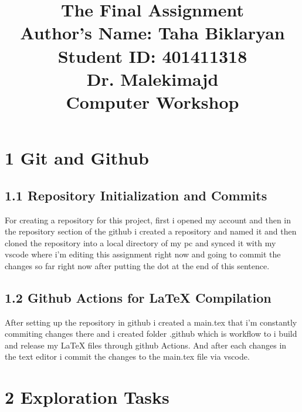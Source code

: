 \documentclass{article}
\title{\Huge The Final Assignment \\[1cm]
\Large Author's Name: Taha Biklaryan \\[0.5cm]
\large Student ID: 401411318 \\[1cm]  
\large Dr. Malekimajd \\[1cm]
\large Computer Workshop}
\date{} %
\begin{document}
\maketitle
\newpage

\tableofcontents %
\newpage

\section*{\Huge 1 Git and Github}
\subsection*{\Large 1.1 Repository Initialization and Commits}
For creating a repository for this project, first i opened my account and then in the repository section of the github i created a repository and named it  and then 
cloned the repository into a local directory of my pc and synced it with my vscode where i'm editing this assignment right now and going to commit the changes so far right now after putting the dot
at the end of this sentence.\\
\subsection*{\Large 1.2 Github Actions for LaTeX Compilation}
After setting up the repository in github i created a main.tex that i'm constantly commiting changes there
and i created folder .github which is workflow to i build and release my LaTeX files through github Actions.
And after each changes in the text editor i commit the changes to the main.tex file via vscode.\\


\section*{\Huge 2 Exploration Tasks}
\end{document}
